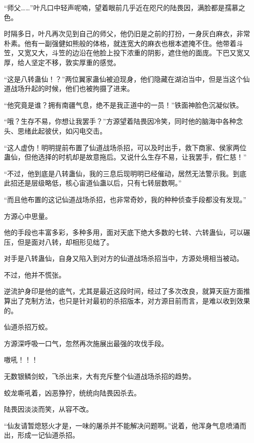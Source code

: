 
\begin{this_body}



“师父……”叶凡口中轻声呢喃，望着眼前几乎近在咫尺的陆畏因，满脸都是孺慕之色。

时隔多日，叶凡再次见到自己的师父，他仍旧是之前的打扮，一身灰白麻衣，非常朴素。他有一副强健如熊般的体格，就连宽大的麻衣也根本遮掩不住。他带着斗笠，又宽又大，斗笠的边沿在他脸上投下浓重的阴影，遮住他的面庞。下巴又宽又厚，给人坚定不移，敦实厚重的感觉。

“这是八转蛊仙！？”两位翼家蛊仙被迫现身，他们隐藏在湖泊当中，但是当这个仙道战场升起的时候，他们也被拘摄了进来。

“他究竟是谁？拥有南疆气息，绝不是我正道中的一员！”铁面神脸色沉凝似铁。

“哦？生存不易，你想让我罢手？”方源望着陆畏因冷笑，同时他的脑海中各种念头、思绪此起彼伏，如闪电交击。

“这人虚伪！明明提前布置了仙道战场杀招，可以及时出手，救下商家、侯家两位蛊仙，但他选择的时机却是故意拖后。又说什么生存不易，让我罢手，假仁慈！”

“不过，他到底是八转蛊仙，我的三息后现明明已经催动，居然无法警示我。到底此招还是层级略低，核心宙道仙蛊以后，只有七转层数啊。”

“而且他布置的这记仙道战场杀招，也非常奇妙，我的种种侦查手段都没有发现。”

方源心中思量。

他的手段也丰富多彩，多种多用，面对天底下绝大多数的七转、六转蛊仙，可以碾压，但是面对八转，却相形见绌了。

对手是八转蛊仙，自身又陷入到对方的仙道战场杀招当中，方源处境相当被动。

不过，他并不慌张。

逆流护身印是他的底气，尤其是最近这段时间，经过了多次改良，就算天庭方面推算出了克制方法，也只是针对最初的杀招版本，对方源目前而言，是难以收到效果的。

仙道杀招万蛟。

方源深呼吸一口气，忽然再次施展出最强的攻伐手段。

嗷吼！！！

无数银鳞剑蛟，飞杀出来，大有充斥整个仙道战场杀招的趋势。

蛟龙嘶吼着，凶恶狰狞，统统向陆畏因杀去。

陆畏因淡淡而笑，从容不改。

“仙友请暂熄怒火才是，一味的屠杀并不能解决问题啊。”说着，他浑身气息喷涌而出，形成一记仙道杀招。


\end{this_body}
